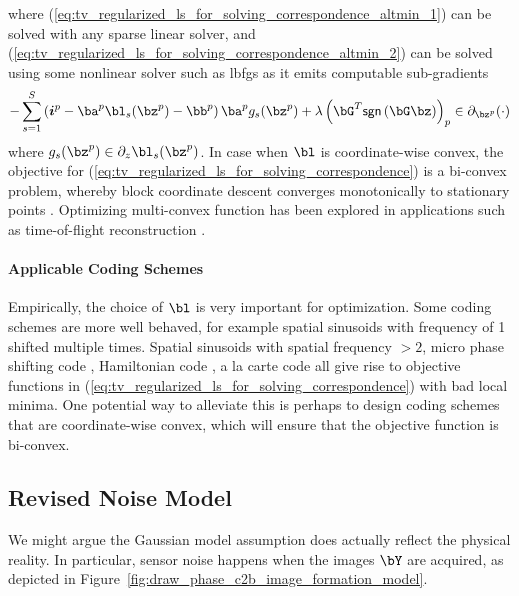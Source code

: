 \documentclass[../writeup.tex]{subfiles}
\begin{document}
where (\ref{eq:tv_regularized_ls_for_solving_correspondence_altmin_1}) can be solved with any sparse linear solver, and (\ref{eq:tv_regularized_ls_for_solving_correspondence_altmin_2}) can be solved using some nonlinear solver such as lbfgs as it emits computable sub-gradients 
\begin{align}
     -\sum_{s=1}^S 
            \left( \si^p - \ba^p \bl_s(\bz^p) - \bb^p \right) \ba^p g_s(\bz^p)
            + \lambda \left( \bG^T \textsf{sgn}\left( \bG \bz \right) \right)_p
        \in \partial_{\bz^p}(\cdot)
    \label{eq:tv_regularized_ls_for_solving_correspondence_altmin_1_gradient}
\end{align}
where $g_s(\bz^p) \in \partial_{z}\bl_s(\bz^p)$. In case when $\bl$ is coordinate-wise convex, the objective for (\ref{eq:tv_regularized_ls_for_solving_correspondence}) is a bi-convex problem, whereby block coordinate descent converges monotonically to stationary points \cite{gorskiBiconvexSetsOptimization2007}. Optimizing multi-convex function has been explored in applications such as time-of-flight reconstruction \cite{heideNonlineofsightImagingPartial2017}. 

\paragraph{Applicable Coding Schemes}

Empirically, the choice of $\bl$ is very important for optimization. Some coding schemes are more well behaved, for example spatial sinusoids with frequency of 1 shifted multiple times. Spatial sinusoids with spatial frequency $> 2$, micro phase shifting code \cite{guptaMicroPhaseShifting2012}, Hamiltonian code \cite{guptaGeometricPerspectiveStructured2018}, a la carte code \cite{mirdehghanOptimalStructuredLight2018} all give rise to objective functions in (\ref{eq:tv_regularized_ls_for_solving_correspondence}) with bad local minima. One potential way to alleviate this is perhaps to design coding schemes that are coordinate-wise convex, which will ensure that the objective function is bi-convex.


\subsection{Revised Noise Model}
We might argue the Gaussian model assumption does actually reflect the physical reality. In particular, sensor noise happens when the images $\bY$ are acquired, as depicted in Figure~\ref{fig:draw_phase_c2b_image_formation_model}.
\end{document}
